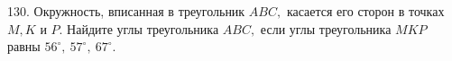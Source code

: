 130. Окружность, вписанная в треугольник $ABC,$ касается его сторон в точках $M, K$ и $P.$ Найдите углы треугольника $ABC,$ если углы треугольника $MKP$ равны $56^\circ,\ 57^\circ,\ 67^\circ.$\\
